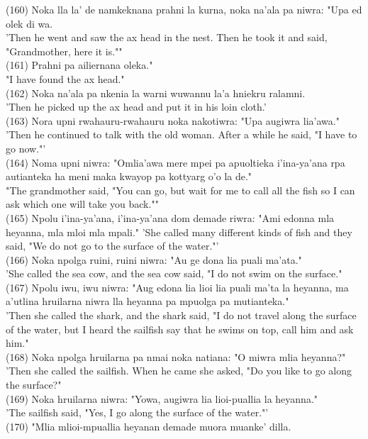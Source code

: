 \documentclass[10pt]{article}
\begin{document}
(160) Noka lla la' de namkeknana prahni la kurna, noka na'ala pa niwra: "Upa ed olek di wa.\\
'Then he went and saw the ax head in the nest. Then he took it and said, "Grandmother, here it is.""\\
(161) Prahni pa ailiernana oleka."\\
"I have found the ax head."\\
(162) Noka na'ala pa nkenia la warni wuwannu la'a hniekru ralamni.\\
'Then he picked up the ax head and put it in his loin cloth.'\\
(163) Nora upni rwahauru-rwahauru noka nakotiwra: "Upa augiwra lia'awa."\\
'Then he continued to talk with the old woman. After a while he said, "I have to go now."'\\
(164) Noma upni niwra: "Omlia'awa mere mpei pa apuoltieka i'ina-ya'ana rpa autianteka ha meni maka kwayop pa kottyarg o'o la de."\\
"The grandmother said, "You can go, but wait for me to call all the fish so I can ask which one will take you back.""\\
(165) Npolu i'ina-ya'ana, i'ina-ya'ana dom demade riwra: "Ami edonna mla heyanna, mla mloi mla mpali." 'She called many different kinds of fish and they said, "We do not go to the surface of the water."'\\
(166) Noka npolga ruini, ruini niwra: "Au ge dona lia puali ma'ata."\\
'She called the sea cow, and the sea cow said, "I do not swim on the surface."\\
(167) Npolu iwu, iwu niwra: "Aug edona lia lioi lia puali ma'ta la heyanna, ma a'utlina hruilarna niwra lla heyanna pa mpuolga pa mutianteka."\\
'Then she called the shark, and the shark said, "I do not travel along the surface of the water, but I heard the sailfish say that he swims on top, call him and ask him."\\
(168) Noka npolga hruilarna pa nmai noka natiana: "O miwra mlia heyanna?"\\
'Then she called the sailfish. When he came she asked, "Do you like to go along the surface?"\\
(169) Noka hruilarna niwra: "Yowa, augiwra lia lioi-puallia la heyanna."\\
'The sailfish said, "Yes, I go along the surface of the water."'\\
(170) "Mlia mlioi-mpuallia heyanan demade muora muanke' dilla.\\
\end{document}
